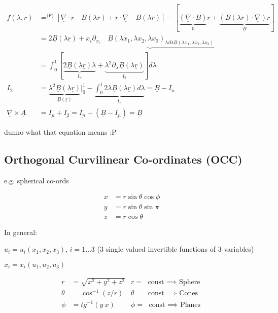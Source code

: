 \documentclass{article}
\begin{document}
\begin{align*}
    f(\lambda, \underline{r}) &=^\text{(F)} [\underline{\nabla} \cdot \underline{r} \quad \underline{B}(\lambda \underline{r}) + \underline{r} \cdot \underline{\nabla} \quad \underline{B}(\lambda \underline{r})] - [\underbrace{(\underline{\nabla} \cdot \underline{B})}_{0} \underline{r} + \underbrace{(\underline{B} (\lambda \underline{r}) \cdot \underline{\nabla}) \underline{r}}_{\underline{B}}]\\
                              &= 2\underline{B}(\lambda \underline{r}) + \underbrace{x_{i}\partial_{x_{i}} \quad \underline{B}(\lambda x_{1}, \lambda x_{2}, \lambda x_{3})_{\lambda\partial\lambda \underline{B}(\lambda x_{1}, \lambda x_{2}, \lambda x_{3})}}\\
                              &= \int_{0}^{1} [\underbrace{2\underline{B}(\lambda\underline{r})\lambda}_{I_{n}} + \underbrace{\lambda^{2}\partial_{\lambda} \underline{B}(\lambda\underline{r})}_{I_{2}}] d\lambda \\
I_{2} &= \underbrace{\lambda^{2}\underline{B}(\lambda\underline{r})}_{\underline{B}(\underline{r})} \big\rvert^{1}_{0} - \underbrace{\int_{0}^{1} 2\lambda \underline{B}(\lambda\underline{r}) d\lambda}_{\underline{I}_{n}} = \underline{B} - \underline{I_{n}} \\
\underline{\nabla} \times \underline{A} &= \underline{I_{n}} + \underline{I_{2}} = \underline{I_{n}} + (\underline{B} - \underline{I_{n}}) = \underline{B}
\end{align*}

dunno what that equation means :P


\subsection{Orthogonal Curvilinear Co-ordinates (OCC)}

e.g. spherical co-ords

\begin{align*}
    x &= r \sin\theta\cos\phi\\
    y &= r\sin\theta\sin\pi\\
    z &= r\cos\theta
\end{align*}

In general: 

$u_{i} = u_{i}(x_{1}, x_{2}, x_{3})$, $i = 1\dots 3$ (3 single valued invertible functions of 3 variables)

$x_{i} = x_{i}(u_{1}, u_{2}, u_{3})$

\begin{align*}
    r &= \sqrt{x^{2} + y^{2} + z^{2}} & r = \text{ const $\implies$ Sphere}\\
    \theta &= \cos ^{-1} (z /r) & \theta = \text{ const $\implies$ Cones}\\
    \phi &= tg^{-1}(y \ x) & \phi = \text{ const $\implies$ Planes}
\end{align*}
\end{document}
